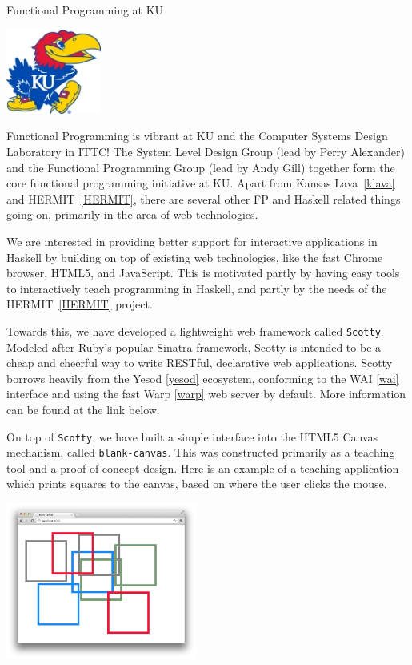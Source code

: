 \begin{hcarentry}{Functional Programming at KU}
\label{ukansas}
\makeheader

\begin{center}
\includegraphics[width=0.235\textwidth]{html/jh2.jpg}
\end{center}

Functional Programming is vibrant at KU and
the Computer Systems Design Laboratory in ITTC!
The System Level Design Group (lead by Perry Alexander)
and the Functional Programming Group (lead by Andy Gill)
together form the core functional programming initiative at KU.
Apart from Kansas Lava~\cref{klava} and HERMIT~\cref{HERMIT},
there are several other
FP and Haskell related things going on,
primarily in the area of web technologies.

We are interested in providing better support for
interactive applications in Haskell by building on top of existing web technologies,
like the fast Chrome browser, HTML5, and JavaScript. This is motivated
partly by having easy tools to interactively teach programming in Haskell,
and partly by the needs of the HERMIT~\cref{HERMIT} project.

Towards this, we have developed a lightweight web framework called {\tt Scotty}.
Modeled after Ruby's popular Sinatra framework, Scotty is intended to
be a cheap and cheerful way to write RESTful, declarative web applications.
Scotty borrows heavily from the Yesod \cref{yesod} ecosystem, conforming
to the WAI \cref{wai} interface and using the fast Warp \cref{warp} web server
by default. More information can be found at the link below.

On top of {\tt Scotty}, we have built a simple interface
into the HTML5 Canvas mechanism, called {\tt blank-canvas}.
This was constructed primarily as a teaching tool and
a proof-of-concept design. Here is an example of
a teaching application which prints squares to the canvas,
based on where the user clicks the mouse.

\begin{center}
\includegraphics[width=0.47\textwidth]{html/squares.png}
\end{center}


\end{hcarentry}
